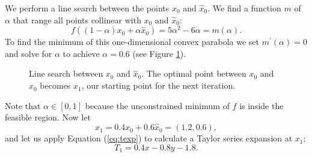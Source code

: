 We perform a line search between the points $x_0$ and $\hat{x}_0$.
We find a function $m$ of $\alpha$ that range all points collinear with $x_0$
and $\hat{x}_0$:
\[
f((1-\alpha) x_0 + \alpha \hat{x}_0) = 5\alpha^2 - 6\alpha = m(\alpha).
\]
To find the minimum of this one-dimensional convex parabola we set
$m^\prime(\alpha) = 0$ and solve for $\alpha$ to achieve $\alpha = 0.6$
(see Figure \ref{fig:steplength}).
\begin{figure}[ht!]
    \centering
    
    \caption{Line search between $x_0$ and $\hat{x}_0$. The optimal point
             between $x_0$ and $\hat{x}_0$ becomes $x_1$, our starting point
             for the next iteration.}
    \label{fig:steplength}
\end{figure}

Note that $\alpha \in [0, 1]$ because the unconstrained minimum of $f$ is
inside the feasible region.
Now let
\[
x_1 = 0.4x_0 + 0.6\hat{x}_0 = (1.2, 0.6),
\]
and let us apply Equation (\ref{eq:texp}) to calculate a Taylor series
expansion at $x_1$:
\[
    T_1 = 0.4x - 0.8y - 1.8.
\]
